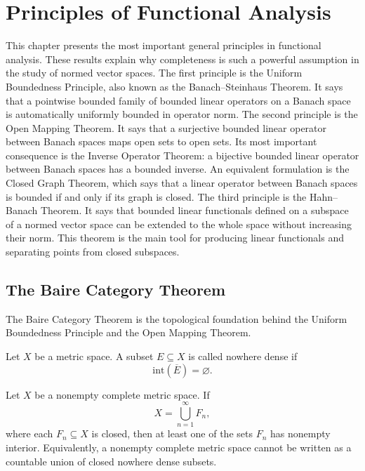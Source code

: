 \chapter{Principles of Functional Analysis}

This chapter presents the most important general principles in functional analysis. These results explain why completeness is such a powerful assumption in the study of normed vector spaces. The first principle is the Uniform Boundedness Principle, also known as the Banach--Steinhaus Theorem. It says that a pointwise bounded family of bounded linear operators on a Banach space is automatically uniformly bounded in operator norm. The second principle is the Open Mapping Theorem. It says that a surjective bounded linear operator between Banach spaces maps open sets to open sets. Its most important consequence is the Inverse Operator Theorem: a bijective bounded linear operator between Banach spaces has a bounded inverse. An equivalent formulation is the Closed Graph Theorem, which says that a linear operator between Banach spaces is bounded if and only if its graph is closed. The third principle is the Hahn--Banach Theorem. It says that bounded linear functionals defined on a subspace of a normed vector space can be extended to the whole space without increasing their norm. This theorem is the main tool for producing linear functionals and separating points from closed subspaces.

\section{The Baire Category Theorem}
The Baire Category Theorem is the topological foundation behind the Uniform Boundedness Principle and the Open Mapping Theorem.

\begin{definition}
    Let \(X\) be a metric space. A subset \(E \subseteq X\) is called nowhere dense if
    \[
        \mathrm{int}\!\left(\overline{E}\right) = \varnothing.
    \]
\end{definition}

\begin{theorem} \label{thm: baire category theorem}
    Let \(X\) be a nonempty complete metric space. If
    \[
        X = \bigcup_{n=1}^{\infty} F_n,
    \]
    where each \(F_n \subseteq X\) is closed, then at least one of the sets \(F_n\) has nonempty interior. Equivalently, a nonempty complete metric space cannot be written as a countable union of closed nowhere dense subsets.
\end{theorem}

